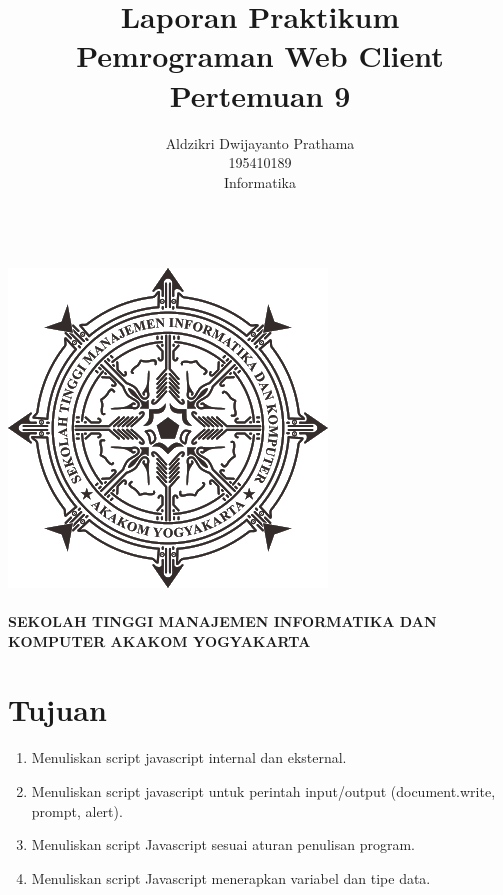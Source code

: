 \documentclass[a4paper,12pt]{article}
\begin{document}
\title{ {\Large Laporan Praktikum}\\ Pemrograman Web Client\\{\Large Pertemuan 9}}

\author{Aldzikri Dwijayanto Prathama 
	\\195410189
	\\Informatika}
\makeatletter
\begin{titlepage}
	\begin{center}
		{\huge \bfseries \@title }\\[14ex]
		\includegraphics[scale=.8]{logo}\\[4ex]
		{\large \@author}\\[12ex]
		{\large \bfseries {SEKOLAH TINGGI MANAJEMEN INFORMATIKA DAN KOMPUTER
				AKAKOM YOGYAKARTA}}
	\end{center}


\end{titlepage}
\makeatother
\renewcommand{\figurename}{Gambar}
\newpage
\tableofcontents
\newpage
\section{Tujuan}
\begin{enumerate}
    \item Menuliskan script javascript internal dan eksternal.
    \item Menuliskan script javascript untuk perintah input/output (document.write, prompt, alert).
    \item Menuliskan script Javascript sesuai aturan penulisan program.
    \item Menuliskan script Javascript menerapkan variabel dan tipe data.
\end{enumerate}
\end{document}
